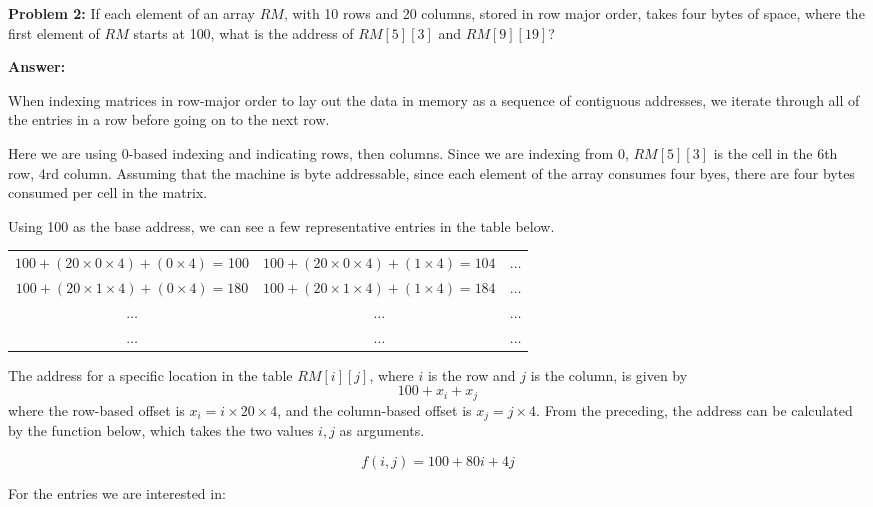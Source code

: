 \documentclass[12pt,letterpaper,final]{report}
\begin{document}
\bigskip

\noindent\textbf{Problem 2:}  If each element of an array $RM$, with 10 rows and 20 columns, stored in row major order, takes four bytes of space, where the first element of $RM$ starts at 100, what is the address of $RM[5][3]$ and $RM[9][19]$?

\noindent\textbf{Answer:}

When indexing matrices in row-major order to lay out the data in memory as a sequence of contiguous addresses, we iterate through all of the entries in a row before going on to the next row. \textcite{byteology2014array}

Here we are using 0-based indexing and indicating rows, then columns. Since we are indexing from $0$, $RM[5][3]$ is the cell in the 6th row, 4rd column. Assuming that the machine is byte addressable, since each element of the array consumes four byes, there are four bytes consumed per cell in the matrix.

Using 100 as the base address, we can see a few representative entries in the table below.
\begin{center}
  \begin{tabular}{|c|c|c|}
    \hline
    $100 + (20 \times 0 \times 4) + (0 \times 4)$ = 100 & $100 + (20 \times 0 \times 4) + (1 \times 4) = 104$ & $\ldots$ \\
    $100 + (20 \times 1 \times 4) + (0 \times 4) = 180$ & $100 + (20 \times 1 \times 4) + (1 \times 4) = 184$ & $\ldots$ \\
    $\ldots$                                            & $\ldots$                                            & $\ldots$ \\
    $\ldots$                                            & $\ldots$                                            & $\ldots$ \\
    \hline
  \end{tabular}
\end{center}

The address for a specific location in the table $RM[i][j]$, where $i$ is the row and $j$ is the column, is given by
\[
  100 + x_i + x_j
\]
where the row-based offset is $x_i = i \times 20 \times 4$, and the column-based offset is $x_j = j \times 4$. From the preceding, the address can be calculated by the function below, which takes the two values $i, j$ as arguments.

\[f(i,j) = 100 + 80i + 4j\]

For the entries we are interested in:
\end{document}
